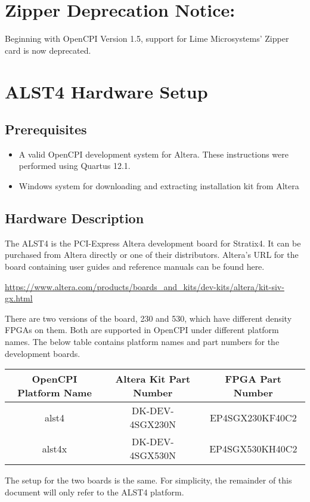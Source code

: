 \documentclass{article}
\begin{document}
\section*{Zipper Deprecation Notice:}
Beginning with OpenCPI Version 1.5, support for Lime Microsystems' Zipper card is now deprecated.
\section*{ALST4 Hardware Setup}
\subsection*{Prerequisites}
\begin{itemize}
\item A valid OpenCPI development system for Altera. These instructions were performed using Quartus 12.1.
\item Windows system for downloading and extracting installation kit from Altera
\end{itemize}
\subsection*{Hardware Description}
 The ALST4 is the PCI-Express Altera development board for Stratix4. It can be purchased from Altera directly or one of their distributors. Altera's URL for the board containing user guides and reference manuals can be found here.\par\bigskip
​\url{https://www.altera.com/products/boards\_and\_kits/dev-kits/altera/kit-siv-gx.html}\par\bigskip
\noindent There are two versions of the board, 230 and 530, which have different density FPGAs on them. Both are supported in OpenCPI under different platform names. The below table contains platform names and part numbers for the development boards.\par\smallskip
\begin{tabular}{|c|c|c|}
\hline
\rowcolor{blue}
OpenCPI Platform Name & Altera Kit Part Number & FPGA Part Number \\
\hline
alst4 &  DK-DEV-4SGX230N & EP4SGX230KF40C2 \\
\hline
alst4x &  DK-DEV-4SGX530N & EP4SGX530KH40C2 \\
\hline
\end{tabular}\par\bigskip
\noindent The setup for the two boards is the same. For simplicity, the remainder of this document will only refer to the ALST4 platform.
\end{document}
